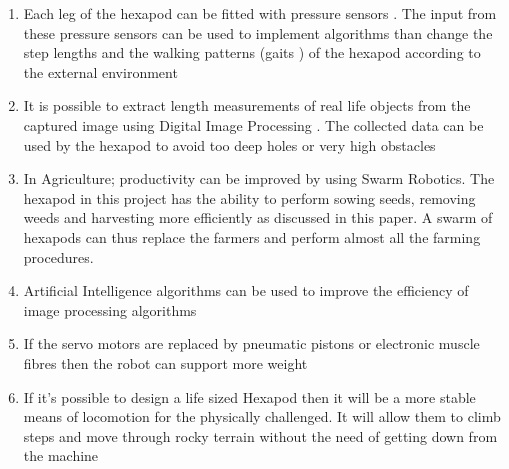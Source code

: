 \documentclass{report}
\begin{document}
\begin{enumerate}
\item	Each leg of the hexapod can be fitted with pressure sensors . The input from these pressure sensors can be used to implement algorithms than change the step lengths and the walking patterns (gaits ) of the hexapod according to the external environment
\item It is possible to extract length measurements of real life objects from the captured image using Digital Image Processing .
The collected data can be used by the hexapod to avoid too deep holes or very high obstacles
\item	In Agriculture; productivity can be improved by using Swarm Robotics. The hexapod in this project has the ability to perform sowing seeds, removing weeds and harvesting more efficiently as discussed in this paper. 
A swarm of hexapods can thus replace the farmers and perform almost all the farming procedures. 
\item	Artificial Intelligence algorithms can be used to improve the efficiency of image processing algorithms
\item	If the servo motors are replaced by pneumatic pistons or electronic muscle fibres then the robot can support more weight
\item If it’s possible to design a life sized Hexapod then it will be a more stable means of locomotion for the physically challenged.
It will allow them to climb steps and move through rocky terrain without the need of getting down from the machine

\end{enumerate} 
\end{document}
